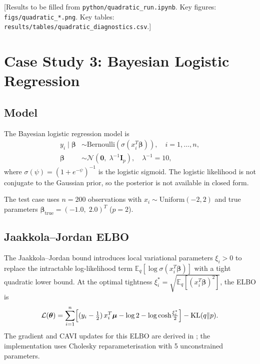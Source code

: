 \documentclass[11pt,a4paper]{article}
\newcommand{\E}{\mathbb{E}}
\newcommand{\N}{\mathcal{N}}
\begin{document}
[Results to be filled from \texttt{python/quadratic\_run.ipynb}.
Key figures: \texttt{figs/quadratic\_*.png}.
Key tables: \texttt{results/tables/quadratic\_diagnostics.csv}.]

\section{Case Study 3: Bayesian Logistic Regression}
\label{sec:logistic}

\subsection{Model}

The Bayesian logistic regression model is
\begin{align}
  y_i \mid \bm{\beta} &\sim \mathrm{Bernoulli}(\sigma(x_i^T\bm{\beta})),
  \quad i = 1,\ldots,n, \\
  \bm{\beta} &\sim \N(\bm{0},\; \lambda^{-1}\bm{I}_p),
  \quad \lambda^{-1} = 10,
\end{align}
where $\sigma(\psi) = (1+e^{-\psi})^{-1}$ is the logistic sigmoid.
The logistic likelihood is not conjugate to the Gaussian prior, so the posterior is not
available in closed form.

The test case uses $n=200$ observations with $x_i \sim \mathrm{Uniform}(-2,2)$ and
true parameters $\bm{\beta}_{\mathrm{true}} = (-1.0,\; 2.0)^T$ ($p=2$).

\subsection{Jaakkola--Jordan ELBO}

The Jaakkola--Jordan bound \parencite{Jaakkola2000} introduces local variational
parameters $\xi_i > 0$ to replace the intractable log-likelihood term
$\E_q[\log\sigma(x_i^T\bm{\beta})]$ with a tight quadratic lower bound.
At the optimal tightness $\xi_i^* = \sqrt{\E_q[(x_i^T\bm{\beta})^2]}$, the ELBO is
\begin{equation}
  \mathcal{L}(\bm{\theta})
  = \sum_{i=1}^{n}
    \Bigl[(y_i - \tfrac{1}{2})\,x_i^T\bm{\mu}
          - \log 2 - \log\cosh\!\tfrac{\xi_i^*}{2}\Bigr]
  - \mathrm{KL}(q\|p).
\end{equation}
The gradient and CAVI updates for this ELBO are derived in \textcite{Jaakkola2000};
the implementation uses Cholesky reparameterisation with 5 unconstrained parameters.
\end{document}
